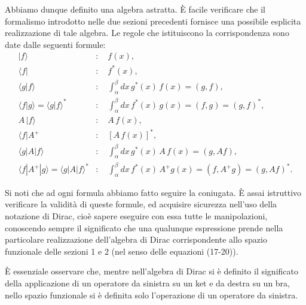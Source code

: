 \documentclass[11pt, a4paper]{book}
\numberwithin{equation}{section}
\begin{document}
Abbiamo dunque definito una algebra astratta. È facile verificare che
il formalismo introdotto nelle due sezioni precedenti fornisce una
possibile esplicita realizzazione di tale algebra. Le regole che
istituiscono la corrispondenza sono date dalle seguenti formule:
\begin{align}
|f\rangle  &:\quad f(x), \tag{17} \\
\langle f| &:\quad f^*(x), \tag{$17^*$} \\
\langle g|f\rangle &:\quad \int_\alpha^\beta dx\, g^*(x)\,f(x)
  = (g,f), \tag{18} \\
\langle f|g\rangle = \langle g|f\rangle^* &:\quad
  \int_\alpha^\beta dx\, f^*(x)\,g(x) = (f,g) = (g,f)^*, \tag{$18^*$} \\
A\,|f\rangle &:\quad A\,f(x), \tag{19} \\
\langle f|A^+ &:\quad [A\,f(x)]^*, \tag{$19^*$} \\
\langle g|A|f\rangle &:\quad \int_\alpha^\beta dx\, g^*(x)\,A\,f(x)
  = (g, Af), \tag{20} \\
\langle f|A^+|g\rangle = \langle g|A|f\rangle^* &:\quad
  \int_\alpha^\beta dx\, f^*(x)\,A^+g(x) = (f, A^+g) = (g,Af)^*.
  \tag{$20^*$}
\end{align}

Si noti che ad ogni formula abbiamo fatto seguire la coniugata. È assai
istruttivo verificare la validità di queste formule, ed acquisire
sicurezza nell'uso della notazione di Dirac, cioè sapere eseguire con
essa tutte le manipolazioni, conoscendo sempre il significato che una
qualunque espressione prende nella particolare realizzazione dell'algebra
di Dirac corrispondente allo spazio funzionale delle sezioni 1 e 2 (nel
senso delle equazioni (17-20)).

È essenziale osservare che, mentre nell'algebra di Dirac si è definito
il significato della applicazione di un operatore da sinistra su un ket e
da destra su un bra, nello spazio funzionale si è definita solo
l'operazione di un operatore da sinistra.

\end{document}
